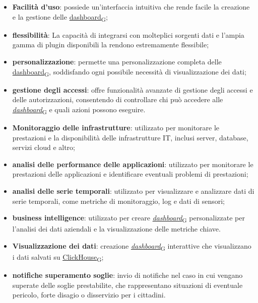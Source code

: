 \begin{itemize}
	\item \textbf{Facilità d'uso}: possiede un'interfaccia intuitiva che rende facile la creazione e la gestione delle \href{https://7last.github.io/docs/pb/documentazione-interna/glossario\#dashboard}{dashboard\textsubscript{G}};
	\item \textbf{flessibilità}: La capacità di integrarsi con molteplici sorgenti dati e l'ampia gamma di plugin disponibili la rendono estremamente flessibile;
	\item \textbf{personalizzazione}: permette una personalizzazione completa delle \href{https://7last.github.io/docs/pb/documentazione-interna/glossario\#dashboard}{dashboard\textsubscript{G}}, soddisfando ogni possibile necessità di visualizzazione dei dati;
	\item \textbf{gestione degli accessi}: offre funzionalità avanzate di gestione degli accessi e delle autorizzazioni, consentendo di controllare chi può accedere alle \href{https://7last.github.io/docs/pb/documentazione-interna/glossario\#dashboard}{\textit{dashboard}\textsubscript{G}} e quali azioni possono eseguire.
\end{itemize}
\begin{itemize}
	\item \textbf{Monitoraggio delle infrastrutture}: utilizzato per monitorare le prestazioni e la disponibilità delle infrastrutture IT, inclusi server, database, servizi cloud e altro;
	\item \textbf{analisi delle performance delle applicazioni}: utilizzato per monitorare le prestazioni delle applicazioni e identificare eventuali problemi di prestazioni;
	\item \textbf{analisi delle serie temporali}: utilizzato per visualizzare e analizzare dati di serie temporali, come metriche di monitoraggio, log e dati di sensori;
	\item \textbf{business intelligence}: utilizzato per creare \href{https://7last.github.io/docs/pb/documentazione-interna/glossario\#dashboard}{\textit{dashboard}\textsubscript{G}} personalizzate per l'analisi dei dati aziendali e la visualizzazione delle metriche chiave.
\end{itemize}
\begin{itemize}
	\item \textbf{Visualizzazione dei dati}: creazione \href{https://7last.github.io/docs/pb/documentazione-interna/glossario\#dashboard}{\textit{dashboard}\textsubscript{G}} interattive che visualizzano i dati salvati su \href{https://7last.github.io/docs/pb/documentazione-interna/glossario\#clickhouse}{ClickHouse\textsubscript{G}};
	\item \textbf{notifiche superamento soglie}: invio di notifiche nel caso in cui vengano superate delle soglie prestabilite, che rappresentano situazioni di eventuale pericolo, forte disagio o disservizio per i cittadini.
\end{itemize}
